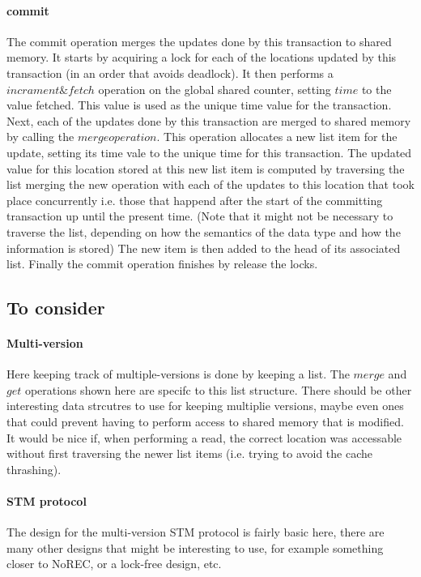 \documentclass[11pt,letterpaper]{article}
\begin{document}
\paragraph{commit}
The commit operation merges the updates done by this transaction
to shared memory.
It starts by acquiring a lock for each of the locations updated by this transaction
(in an order that avoids deadlock).
It then performs a $\mathit{incrament\&fetch}$ operation on the global shared counter,
setting $\mathit{time}$ to the value fetched.
This value is used as the unique time value for the transaction.
Next, each of the updates done by this transaction are merged to shared memory by
calling the $\mathit{merge operation}$.
This operation allocates a new list item for the update, setting its time vale
to the unique time for this transaction.
The updated value for this location stored at this new list item is computed by traversing the list merging
the new operation with each of the updates to this location that took place concurrently i.e. those that happend
after the start of the committing transaction up until the present time.
(Note that it might not be necessary to traverse the list, depending on how the semantics of the
data type and how the information is stored)
The new item is then added to the head of its associated list.
Finally the commit operation finishes by release the locks.


\subsection{To consider}
\paragraph{Multi-version}
Here keeping track of multiple-versions is done by keeping a list.
The $\mathit{merge}$ and $\mathit{get}$ operations shown here are specifc to this list structure.
There should be other interesting data strcutres to use for keeping multiplie versions, maybe
even ones that could prevent having to perform access to shared memory that is modified.
It would be nice if, when performing a read, the correct location was accessable without first traversing the newer
list items (i.e. trying to avoid the cache thrashing).

\paragraph{STM protocol}
The design for the multi-version STM protocol is fairly basic here, there are many other designs that might
be interesting to use, for example something closer to NoREC, or
a lock-free design, etc.
\end{document}
